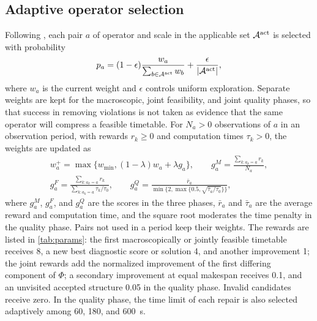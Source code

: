 \subsection{Adaptive operator selection}\label{sec:adaptive}
Following \citet{Ropke2006}, each pair $a$ of operator and scale in the applicable set $\mathcal{A}^{\mathrm{act}}$ is selected with probability
\begin{equation}
p_a=(1-\epsilon)\frac{w_a}{\sum_{b\in\mathcal{A}^{\mathrm{act}}}w_b}+\frac{\epsilon}{|\mathcal{A}^{\mathrm{act}}|},\label{eq:select-prob}
\end{equation}
where $w_a$ is the current weight and $\epsilon$ controls uniform exploration. Separate weights are kept for the macroscopic, joint feasibility, and joint quality phases, so that success in removing violations is not taken as evidence that the same operator will compress a feasible timetable. For $N_a>0$ observations of $a$ in an observation period, with rewards $r_k\ge0$ and computation times $\tau_k>0$, the weights are updated as
\begin{equation}
\begin{gathered}
w^+_a=\max\{w_{\min},(1-\lambda)w_a+\lambda g_a\},\qquad
g^M_a=\frac{\sum_{k:a_k=a}r_k}{N_a},\\ g^F_a=\frac{\sum_{k:a_k=a}r_k}{\sum_{k:a_k=a}\tau_k/\tau_0},\qquad
g^Q_a=\frac{\bar r_a}{\min\{2,\max\{0.5,\sqrt{\bar\tau_a/\tau_0}\}\}},
\end{gathered}\label{eq:weights}
\end{equation}
where $g^M_a$, $g^F_a$, and $g^Q_a$ are the scores in the three phases, $\bar r_a$ and $\bar\tau_a$ are the average reward and computation time, and the square root moderates the time penalty in the quality phase. Pairs not used in a period keep their weights. The rewards are listed in \cref{tab:params}: the first macroscopically or jointly feasible timetable receives 8, a new best diagnostic score or solution 4, and another improvement 1; the joint rewards add the normalized improvement of the first differing component of $\Phi$; a secondary improvement at equal makespan receives 0.1, and an unvisited accepted structure 0.05 in the quality phase. Invalid candidates receive zero. In the quality phase, the time limit of each repair is also selected adaptively among 60, 180, and 600~s.


